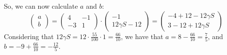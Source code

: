 So, we can now calculate $a$ and $b$:
\begin{equation*}
\begin{pmatrix}
a \\
b
\end{pmatrix}
=
\begin{pmatrix}
4 & -1 \\
-3 & 1
\end{pmatrix}
\cdot
\begin{pmatrix}
-1 \\
12 \gamma S - 12
\end{pmatrix}
=
\begin{pmatrix}
-4 +12 -12 \gamma S \\
3 - 12 + 12 \gamma S
\end{pmatrix}
\end{equation*}
Considering that $12 \gamma S = 12 \cdot \frac{55}{100} \cdot 1 = \frac{66}{10}$,
we have that $a = 8 - \frac{66}{10} = \frac{7}{5}$, and 
$b = -9 + \frac{66}{10} = -\frac{12}{5}$.